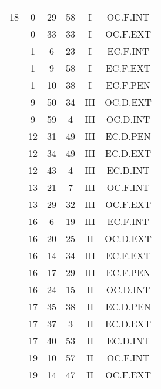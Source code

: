 \documentclass[12pt, a4paper]{article}
\begin{document}
\begin{multicols}{3}
{\begin{tabular}{c c c c c c}
	 	 	 	 & & & & & \\%
	 	 	 	18 & 0 & 29 & 58 & I & OC.F.INT\\%
	 	 	 	 & 0 & 33 & 33 & I & OC.F.EXT\\%
	 	 	 	 & 1 & 6 & 23 & I & EC.F.INT\\%
	 	 	 	 & 1 & 9 & 58 & I & EC.F.EXT\\%
	 	 	 	 & 1 & 10 & 38 & I & EC.F.PEN\\%
	 	 	 	 & 9 & 50 & 34 & III & OC.D.EXT\\%
	 	 	 	 & 9 & 59 & 4 & III & OC.D.INT\\%
	 	 	 	 & 12 & 31 & 49 & III & EC.D.PEN\\%
	 	 	 	 & 12 & 34 & 49 & III & EC.D.EXT\\%
	 	 	 	 & 12 & 43 & 4 & III & EC.D.INT\\%
	 	 	 	 & 13 & 21 & 7 & III & OC.F.INT\\%
	 	 	 	 & 13 & 29 & 32 & III & OC.F.EXT\\%
	 	 	 	 & 16 & 6 & 19 & III & EC.F.INT\\%
	 	 	 	 & 16 & 20 & 25 & II & OC.D.EXT\\%
	 	 	 	 & 16 & 14 & 34 & III & EC.F.EXT\\%
	 	 	 	 & 16 & 17 & 29 & III & EC.F.PEN\\%
	 	 	 	 & 16 & 24 & 15 & II & OC.D.INT\\%
	 	 	 	 & 17 & 35 & 38 & II & EC.D.PEN\\%
	 	 	 	 & 17 & 37 & 3 & II & EC.D.EXT\\%
	 	 	 	 & 17 & 40 & 53 & II & EC.D.INT\\%
	 	 	 	 & 19 & 10 & 57 & II & OC.F.INT\\%
	 	 	 	 & 19 & 14 & 47 & II & OC.F.EXT\\%

\end{tabular}}
\end{multicols}
\end{document}
